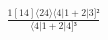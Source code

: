 \documentclass[varwidth, border=5pt]{standalone}
\begin{document}
\begin{my}
$\begin{gathered}
\scriptscriptstyle\frac{1[14]⟨24⟩⟨4|1+2|3]²}{⟨4|1+2|4]³}
\end{gathered}$
\end{my}
\end{document}
